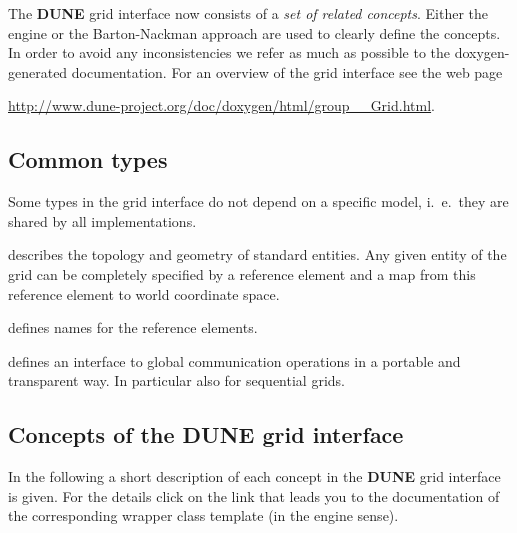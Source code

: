\documentclass[11pt,a4paper,headinclude,footinclude,DIV16,normalheadings]{scrreprt}
\newcommand{\Dune}{{\sf\bfseries DUNE}\xspace}
\begin{document}
The \Dune{} grid interface now consists of a \textit{set of related concepts}.
Either the engine or the Barton-Nackman approach are used to clearly
define the concepts. In order to avoid any inconsistencies we refer as
much as possible to the doxygen-generated documentation. For an
overview of the grid interface see the web page 
\begin{center}
\url{http://www.dune-project.org/doc/doxygen/html/group__Grid.html}.
\end{center}


\subsection{Common types}

Some types in the grid interface do not depend on a specific model,
i.~e.~they are shared by all implementations.

               
describes the topology and geometry of standard entities. Any given
entity of the grid can be completely specified by a reference element
and a map from this reference element to world coordinate space. 


defines names for the reference elements.


defines an interface to global communication operations in a portable
and transparent way. In particular also for sequential grids. 


\subsection{Concepts of the \texorpdfstring{\Dune{}}{DUNE} grid interface}

In the following a short description of each concept in the \Dune{}
grid interface is given. For the details click on the link that leads
you to the documentation of the corresponding wrapper class template 
(in the engine sense).

\end{document}
